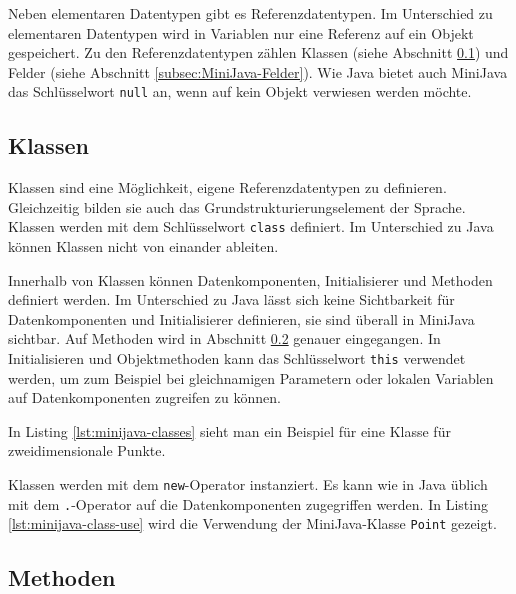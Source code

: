 Neben elementaren Datentypen gibt es Referenzdatentypen. Im Unterschied zu elementaren Datentypen wird in Variablen nur eine Referenz auf ein Objekt gespeichert. Zu den Referenzdatentypen zählen Klassen (siehe Abschnitt \ref{subsec:MiniJava-Klassen}) und Felder (siehe Abschnitt \ref{subsec:MiniJava-Felder}). Wie Java bietet auch MiniJava das Schlüsselwort \lstinline{null} an, wenn auf kein Objekt verwiesen werden möchte.

\subsection{Klassen}
\label{subsec:MiniJava-Klassen}

Klassen sind eine Möglichkeit, eigene Referenzdatentypen zu definieren. Gleichzeitig bilden sie auch das Grundstrukturierungselement der Sprache. Klassen werden mit dem Schlüsselwort \lstinline{class} definiert. Im Unterschied zu Java können Klassen nicht von einander ableiten.

Innerhalb von Klassen können Datenkomponenten, Initialisierer und Methoden definiert werden. Im Unterschied zu Java lässt sich keine Sichtbarkeit für Datenkomponenten und Initialisierer definieren, sie sind überall in MiniJava sichtbar. Auf Methoden wird in Abschnitt \ref{subsec:MiniJava-Methoden} genauer eingegangen. In Initialisieren und Objektmethoden kann das Schlüsselwort \lstinline{this} verwendet werden, um zum Beispiel bei gleichnamigen Parametern oder lokalen Variablen auf Datenkomponenten zugreifen zu können.

In Listing \ref{lst:minijava-classes} sieht man ein Beispiel für eine Klasse für zweidimensionale Punkte.



Klassen werden mit dem \lstinline{new}-Operator instanziert. Es kann wie in Java üblich mit dem \lstinline{.}-Operator auf die Datenkomponenten zugegriffen werden. In Listing \ref{lst:minijava-class-use} wird die Verwendung der MiniJava-Klasse \lstinline{Point} gezeigt.



\subsection{Methoden}
\label{subsec:MiniJava-Methoden}

